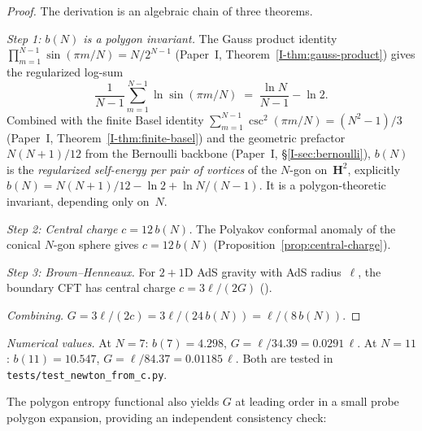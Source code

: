 \begin{proof}
The derivation is an algebraic chain of three theorems.

\emph{Step 1: $b(N)$ is a polygon invariant.}
The Gauss product identity
$\prod_{m=1}^{N-1}\sin(\pi m/N) = N/2^{N-1}$
(Paper~I, Theorem~\ref*{I-thm:gauss-product})
gives the regularized log-sum
\begin{equation}\label{eq:bN-from-gauss}
  \frac{1}{N{-}1}\sum_{m=1}^{N-1}\ln\sin(\pi m/N)
  \;=\; \frac{\ln N}{N{-}1} - \ln 2.
\end{equation}
Combined with the finite Basel identity
$\sum_{m=1}^{N-1}\csc^2(\pi m/N) = (N^2{-}1)/3$
(Paper~I, Theorem~\ref*{I-thm:finite-basel})
and the geometric prefactor $N(N{+}1)/12$
from the Bernoulli backbone
(Paper~I, \S\ref*{I-sec:bernoulli}), $b(N)$ is the
\emph{regularized self-energy per pair of vortices} of the
$N$-gon on~$\mathbf{H}^2$, explicitly
$b(N) = N(N{+}1)/12 - \ln 2 + \ln N/(N{-}1)$.
It is a polygon-theoretic invariant, depending only on~$N$.

\emph{Step 2: Central charge $c = 12\,b(N)$.}
The Polyakov conformal anomaly of the conical $N$-gon sphere
gives $c = 12\,b(N)$
(Proposition~\ref{prop:central-charge}).

\emph{Step 3: Brown--Henneaux.}
For $2{+}1$D AdS gravity with AdS radius~$\ell$, the boundary
CFT has central charge
$c = 3\ell/(2G)$ (\citealt{BrownHenneaux1986}).

\emph{Combining.}
$G = 3\ell/(2c) = 3\ell/(24\,b(N)) = \ell/(8\,b(N))$.
\end{proof}

\emph{Numerical values.}
At $N = 7$: $b(7) = 4.298$, $G = \ell/34.39 = 0.0291\,\ell$.
At $N = 11$: $b(11) = 10.547$, $G = \ell/84.37 = 0.01185\,\ell$.
Both are tested in \texttt{tests/test\_newton\_from\_c.py}.

\bigskip
The polygon entropy functional also yields $G$ at leading order
in a small probe polygon expansion, providing an independent
consistency check:

